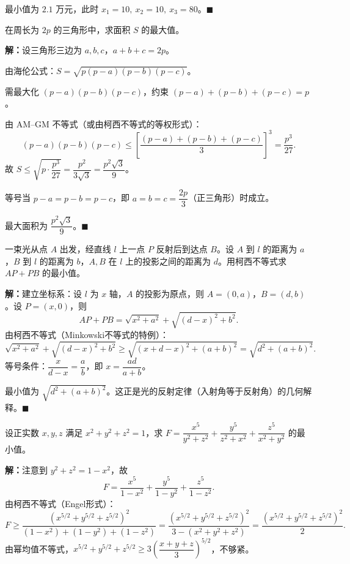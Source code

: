 \documentclass[12pt, a4paper]{ctexart}
\begin{document}
最小值为 $\boxed{2.1}$ 万元，此时 $x_1 = 10,\ x_2 = 10,\ x_3 = 80$。\hfill $\blacksquare$

\begin{appbox}[【应用2】几何最优化]
在周长为 $2p$ 的三角形中，求面积 $S$ 的最大值。
\end{appbox}

\textbf{解：}设三角形三边为 $a, b, c$，$a + b + c = 2p$。

由海伦公式：$S = \sqrt{p(p-a)(p-b)(p-c)}$。

需最大化 $(p-a)(p-b)(p-c)$，约束 $(p-a) + (p-b) + (p-c) = p$。

由 AM--GM 不等式（或由柯西不等式的等权形式）：
\[
  (p-a)(p-b)(p-c) \leqslant \left[\frac{(p-a)+(p-b)+(p-c)}{3}\right]^3 = \frac{p^3}{27}.
\]
故 $S \leqslant \sqrt{p \cdot \dfrac{p^3}{27}} = \dfrac{p^2}{3\sqrt{3}} = \dfrac{p^2\sqrt{3}}{9}$。

等号当 $p - a = p - b = p - c$，即 $a = b = c = \dfrac{2p}{3}$（正三角形）时成立。

最大面积为 $\boxed{\dfrac{p^2\sqrt{3}}{9}}$。\hfill $\blacksquare$

\begin{appbox}
一束光从点 $A$ 出发，经直线 $l$ 上一点 $P$ 反射后到达点 $B$。设 $A$ 到 $l$ 的距离为 $a$，$B$ 到 $l$ 的距离为 $b$，$A, B$ 在 $l$ 上的投影之间的距离为 $d$。用柯西不等式求 $AP + PB$ 的最小值。
\end{appbox}

\textbf{解：}建立坐标系：设 $l$ 为 $x$ 轴，$A$ 的投影为原点，则 $A = (0, a)$，$B = (d, b)$。设 $P = (x, 0)$，则
\[
  AP + PB = \sqrt{x^2 + a^2} + \sqrt{(d-x)^2 + b^2}.
\]
由柯西不等式（Minkowski不等式的特例）：
\[
  \sqrt{x^2 + a^2} + \sqrt{(d-x)^2 + b^2} \geqslant \sqrt{(x + d - x)^2 + (a + b)^2} = \sqrt{d^2 + (a+b)^2}.
\]
等号条件：$\dfrac{x}{d-x} = \dfrac{a}{b}$，即 $x = \dfrac{ad}{a+b}$。

最小值为 $\boxed{\sqrt{d^2 + (a+b)^2}}$。这正是光的反射定律（入射角等于反射角）的几何解释。\hfill $\blacksquare$

\begin{appbox}[【应用4】竞赛中的极值问题]
设正实数 $x, y, z$ 满足 $x^2 + y^2 + z^2 = 1$，求 $F = \dfrac{x^5}{y^2 + z^2} + \dfrac{y^5}{z^2 + x^2} + \dfrac{z^5}{x^2 + y^2}$ 的最小值。
\end{appbox}

\textbf{解：}注意到 $y^2 + z^2 = 1 - x^2$，故
\[
  F = \frac{x^5}{1-x^2} + \frac{y^5}{1-y^2} + \frac{z^5}{1-z^2}.
\]
由柯西不等式（Engel形式）：
\[
  F \geqslant \frac{(x^{5/2} + y^{5/2} + z^{5/2})^2}{(1-x^2) + (1-y^2) + (1-z^2)} = \frac{(x^{5/2} + y^{5/2} + z^{5/2})^2}{3 - (x^2 + y^2 + z^2)} = \frac{(x^{5/2} + y^{5/2} + z^{5/2})^2}{2}.
\]
由幂均值不等式，$x^{5/2} + y^{5/2} + z^{5/2} \geqslant 3\left(\dfrac{x+y+z}{3}\right)^{5/2}$，不够紧。
\end{document}
